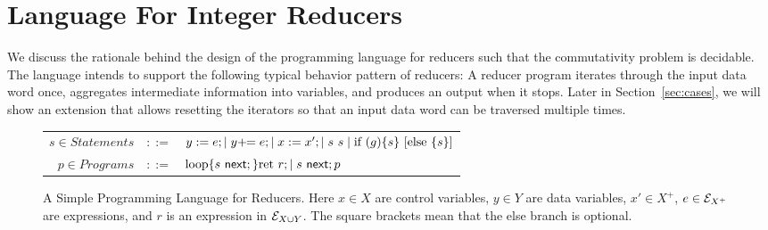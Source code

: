  
\section{Language For Integer Reducers}\label{sec-mr-prog}
\label{sec:language}
We discuss the rationale behind the design of the programming language for reducers such that the commutativity problem is decidable. The language intends to support the following typical behavior pattern of reducers: A reducer program iterates through the input data word once, aggregates intermediate information into variables, and produces an output when it stops. 
%
Later in Section~\ref{sec:cases}, we will show an extension that allows resetting the iterators so that an input data word can be traversed multiple times.
%
\vspace{-4mm}
\begin{figure}
	\centering
	\begin{tabular}{rcl}
        $ s \in Statements$&$::=$&$y := e;\mid y +\!\!= e; \mid x:=x';\mid s\ s \mid \mbox{if } (g) \{s\} \mbox{ [else } \{s\}\mbox{]}$\\
		$ p\in Programs$&$::=$&$\loopL{s\ \nnext;}\mbox{ret }r; \mid s\ \nnext;p$		
	\end{tabular}
	\caption{A Simple Programming Language for Reducers. Here $x\in X$ are control variables, $y\in Y$ are data variables, $x' \in X^+$, $e\in {\mathcal{E} }_{X^+}$ are expressions, and $r$ is an expression in ${\mathcal{E} }_{X \cup Y}$. The square brackets mean that the else branch is optional. 
	}
	\label{fig:language}
\end{figure}

\vspace{-4mm}

